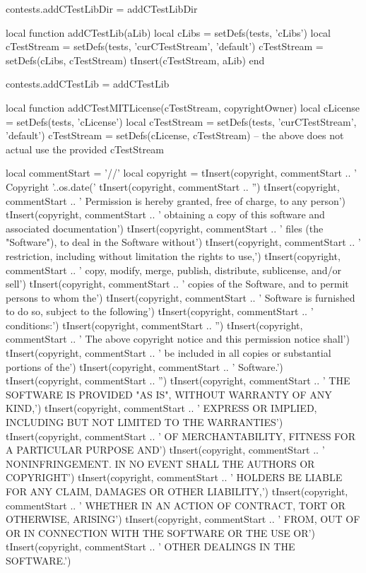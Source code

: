 contests.addCTestLibDir = addCTestLibDir

local function addCTestLib(aLib)
  local cLibs          = setDefs(tests, 'cLibs')
  local cTestStream    = setDefs(tests, 'curCTestStream', 'default')
  cTestStream          = setDefs(cLibs, cTestStream)
  tInsert(cTestStream, aLib)
end

contests.addCTestLib = addCTestLib

local function addCTestMITLicense(cTestStream, copyrightOwner)
  local cLicense       = setDefs(tests, 'cLicense')
  local cTestStream    = setDefs(tests, 'curCTestStream', 'default')
  cTestStream          = setDefs(cLicense, cTestStream)
  -- the above does not actual use the provided cTestStream
  
  local commentStart = '//'
  local copyright = { }
  tInsert(copyright, commentStart ..
    ' Copyright '..os.date('%
  tInsert(copyright,  commentStart .. 
    '')
  tInsert(copyright, commentStart ..
    ' Permission is hereby granted, free of charge, to any person')
  tInsert(copyright, commentStart ..
    ' obtaining a copy of this software and associated documentation')
  tInsert(copyright, commentStart ..
    ' files (the "Software"), to deal in the Software without')
  tInsert(copyright, commentStart ..
    ' restriction, including without limitation the rights to use,')
  tInsert(copyright, commentStart ..
    ' copy, modify, merge, publish, distribute, sublicense, and/or sell')
  tInsert(copyright, commentStart ..
    ' copies of the Software, and to permit persons to whom the')
  tInsert(copyright, commentStart ..
    ' Software is furnished to do so, subject to the following')
  tInsert(copyright, commentStart ..
    ' conditions:')
  tInsert(copyright, commentStart ..
    '')
  tInsert(copyright, commentStart ..
    '    The above copyright notice and this permission notice shall')
  tInsert(copyright, commentStart ..
    '    be included in all copies or substantial portions of the')
  tInsert(copyright, commentStart ..
    '    Software.')
  tInsert(copyright, commentStart ..
    '')
  tInsert(copyright, commentStart ..
    ' THE SOFTWARE IS PROVIDED "AS IS", WITHOUT WARRANTY OF ANY KIND,')
  tInsert(copyright, commentStart ..
    ' EXPRESS OR IMPLIED, INCLUDING BUT NOT LIMITED TO THE WARRANTIES')
  tInsert(copyright, commentStart ..
    ' OF MERCHANTABILITY, FITNESS FOR A PARTICULAR PURPOSE AND')
  tInsert(copyright, commentStart ..
    ' NONINFRINGEMENT. IN NO EVENT SHALL THE AUTHORS OR COPYRIGHT')
  tInsert(copyright, commentStart ..
    ' HOLDERS BE LIABLE FOR ANY CLAIM, DAMAGES OR OTHER LIABILITY,')
  tInsert(copyright, commentStart ..
    ' WHETHER IN AN ACTION OF CONTRACT, TORT OR OTHERWISE, ARISING')
  tInsert(copyright, commentStart ..
    ' FROM, OUT OF OR IN CONNECTION WITH THE SOFTWARE OR THE USE OR')
  tInsert(copyright, commentStart ..
    ' OTHER DEALINGS IN THE SOFTWARE.')

